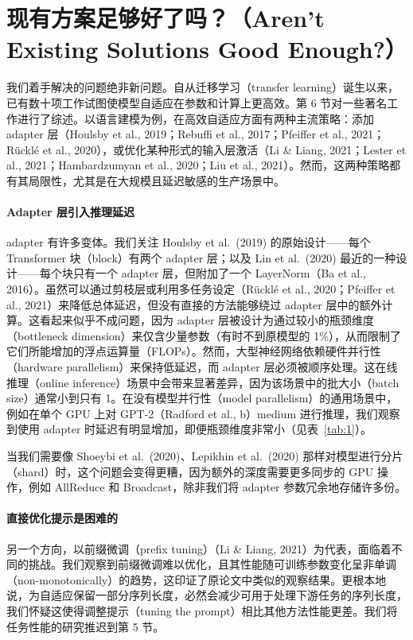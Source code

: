 \documentclass[11pt,UTF8,fontset=fandol]{ctexart}
\begin{document}
\section{现有方案足够好了吗？（Aren't Existing Solutions Good Enough?）}

我们着手解决的问题绝非新问题。自从迁移学习（transfer learning）诞生以来，已有数十项工作试图使模型自适应在参数和计算上更高效。第 6 节对一些著名工作进行了综述。以语言建模为例，在高效自适应方面有两种主流策略：添加 adapter 层（Houlsby et al., 2019；Rebuffi et al., 2017；Pfeiffer et al., 2021；Rücklé et al., 2020），或优化某种形式的输入层激活（Li \& Liang, 2021；Lester et al., 2021；Hambardzumyan et al., 2020；Liu et al., 2021）。然而，这两种策略都有其局限性，尤其是在大规模且延迟敏感的生产场景中。

\paragraph{Adapter 层引入推理延迟}adapter 有许多变体。我们关注 Houlsby et al.\ (2019) 的原始设计——每个 Transformer 块（block）有两个 adapter 层；以及 Lin et al.\ (2020) 最近的一种设计——每个块只有一个 adapter 层，但附加了一个 LayerNorm（Ba et al., 2016）。虽然可以通过剪枝层或利用多任务设定（Rücklé et al., 2020；Pfeiffer et al., 2021）来降低总体延迟，但没有直接的方法能够绕过 adapter 层中的额外计算。这看起来似乎不成问题，因为 adapter 层被设计为通过较小的瓶颈维度（bottleneck dimension）来仅含少量参数（有时不到原模型的 1\%），从而限制了它们所能增加的浮点运算量（FLOPs）。然而，大型神经网络依赖硬件并行性（hardware parallelism）来保持低延迟，而 adapter 层必须被顺序处理。这在线推理（online inference）场景中会带来显著差异，因为该场景中的批大小（batch size）通常小到只有 1。在没有模型并行性（model parallelism）的通用场景中，例如在单个 GPU 上对 GPT-2（Radford et al., b）medium 进行推理，我们观察到使用 adapter 时延迟有明显增加，即便瓶颈维度非常小（见表~\ref{tab:1}）。

当我们需要像 Shoeybi et al.\ (2020)、Lepikhin et al.\ (2020) 那样对模型进行分片（shard）时，这个问题会变得更糟，因为额外的深度需要更多同步的 GPU 操作，例如 AllReduce 和 Broadcast，除非我们将 adapter 参数冗余地存储许多份。

\paragraph{直接优化提示是困难的}另一个方向，以前缀微调（prefix tuning）（Li \& Liang, 2021）为代表，面临着不同的挑战。我们观察到前缀微调难以优化，且其性能随可训练参数变化呈非单调（non-monotonically）的趋势，这印证了原论文中类似的观察结果。更根本地说，为自适应保留一部分序列长度，必然会减少可用于处理下游任务的序列长度，我们怀疑这使得调整提示（tuning the prompt）相比其他方法性能更差。我们将任务性能的研究推迟到第 5 节。
\end{document}

